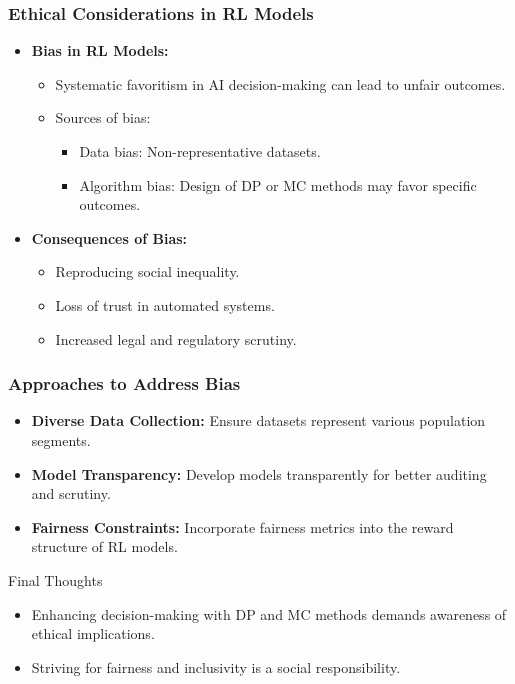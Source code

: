 \documentclass[aspectratio=169]{beamer}
\begin{document}
\begin{frame}[fragile]
    \frametitle{Ethical Considerations in RL Models}
    \begin{itemize}
        \item \textbf{Bias in RL Models:}
        \begin{itemize}
            \item Systematic favoritism in AI decision-making can lead to unfair outcomes.
            \item Sources of bias:
            \begin{itemize}
                \item Data bias: Non-representative datasets.
                \item Algorithm bias: Design of DP or MC methods may favor specific outcomes.
            \end{itemize}
        \end{itemize}

        \item \textbf{Consequences of Bias:}
        \begin{itemize}
            \item Reproducing social inequality.
            \item Loss of trust in automated systems.
            \item Increased legal and regulatory scrutiny.
        \end{itemize}
    \end{itemize}
\end{frame}

\begin{frame}[fragile]
    \frametitle{Approaches to Address Bias}
    \begin{itemize}
        \item \textbf{Diverse Data Collection:} Ensure datasets represent various population segments.
        \item \textbf{Model Transparency:} Develop models transparently for better auditing and scrutiny.
        \item \textbf{Fairness Constraints:} Incorporate fairness metrics into the reward structure of RL models.
    \end{itemize}

    \begin{block}{Final Thoughts}
        \begin{itemize}
            \item Enhancing decision-making with DP and MC methods demands awareness of ethical implications.
            \item Striving for fairness and inclusivity is a social responsibility.
        \end{itemize}
    \end{block}
\end{frame}
\end{document}
